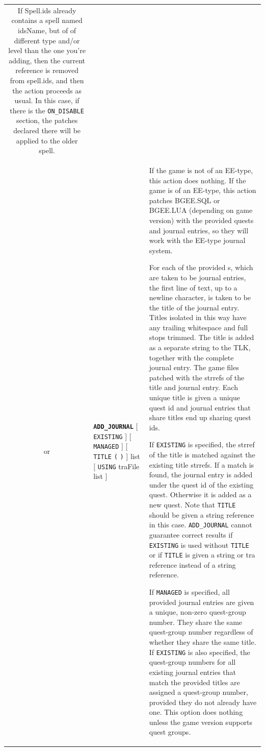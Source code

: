 \documentclass{article}
\def\ttref#1{\ahrefloc{#1}{\tt #1}}
\def\DEFINE#1{{\tt \bf #1}\label{#1}\index{#1}}
\def\t#1{{\tt #1}}
\def\Slist{{\color{red} list }}
\def\Ob{{\color{red} [ }}
\def\Oe{{\color{red} ] }}
\begin{document}
\begin{tabular}{cp{10in}|p{10in}}
	If Spell.ids already contains a spell named idsName, but of of different
	type and/or level than the one you're adding, then the current reference
	is removed from spell.ids, and then the action proceeds as usual. In this
	case, if there is the \verb+ON_DISABLE+ section, the patches declared
	there will be applied to the older spell.
	\\

  or & \DEFINE{ADD_JOURNAL} \Ob \t{EXISTING} \Oe \Ob \t{MANAGED} \Oe \Ob
       \t{TITLE} \t{(} \ttref{text} \t{)} \Oe \ttref{reference} \Slist \Ob
       \t{USING} traFile \Slist \Oe &

    If the game is not of an EE-type, this action does nothing.  If
    the game is of an EE-type, this action patches BGEE.SQL or
    BGEE.LUA (depending on game version) with the provided quests and
    journal entries, so they will work with the EE-type journal
    system.

    For each of the provided \ttref{reference}s, which are taken to be
    journal entries, the first line of text, up to a newline character, is
    taken to be the title of the journal entry. Titles isolated in this way
    have any trailing whitespace and full stops trimmed. The title is added
    as a separate string to the TLK, together with the complete journal entry.
    The game files patched with the strrefs of the title and journal entry.
    Each unique title is given a unique quest id and journal entries that
    share titles end up sharing quest ids.

    If \t{EXISTING} is specified, the strref of the title is matched
    against the existing title strrefs. If a match is found, the
    journal entry is added under the quest id of the existing
    quest. Otherwise it is added as a new quest. Note that \t{TITLE}
    should be given a string reference in this case. \t{ADD_JOURNAL}
    cannot guarantee correct results if \t{EXISTING} is used without
    \t{TITLE} or if \t{TITLE} is given a string or tra reference
    instead of a string reference.

    If \t{MANAGED} is specified, all provided journal entries are given a
    unique, non-zero quest-group number. They share the same quest-group
    number regardless of whether they share the same title. If \t{EXISTING}
    is also specified, the quest-group numbers for all existing journal
    entries that match the provided titles are assigned a quest-group
    number, provided they do not already have one. This option does nothing
    unless the game version supports quest groups.


\end{tabular}
\end{document}
